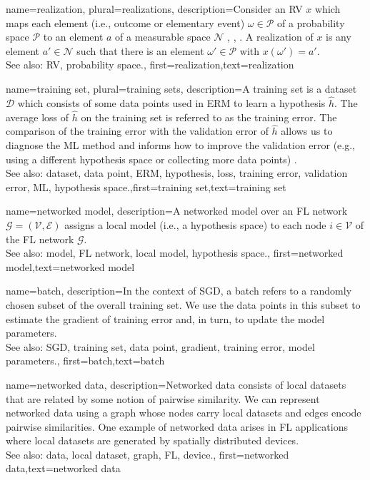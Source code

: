 	
{name={realization}, plural={realizations},
	description={Consider an RV $x$ which maps each element 
	(i.e., outcome or elementary event) $\omega \in \mathcal{P}$ of a probability space $\mathcal{P}$ 
	to an element $a$ of a measurable space $\mathcal{N}$ \cite{RudinBookPrinciplesMatheAnalysis}, \cite{BillingsleyProbMeasure}, \cite{HalmosMeasure}. 
	A realization of $x$ is any element $a' \in \mathcal{N}$ such that there is 
	an element $\omega' \in \mathcal{P}$ with $x(\omega') = a'$.
			\\
		See also: RV, probability space.}, first={realization},text={realization}  }

{name={training set}, plural={training sets},
description={A training set is a dataset $\mathcal{D}$ which consists of some data points used in ERM 
	to learn a hypothesis $\hat{h}$. The average loss of $\hat{h}$ on the 
	training set is referred to as the training error. The comparison of the training error with the 
	validation error of $\hat{h}$ allows us to diagnose the ML method and informs how to improve 
	the validation error (e.g., using a different hypothesis space or collecting more data points) \cite[Sec. 6.6]{MLBasics}.
			\\
		See also: dataset, data point, ERM, hypothesis, loss, training error, validation error, ML, hypothesis space.},first={training set},text={training set}  
}

{name={networked model},
  description={A networked model over an FL network $\mathcal{G} = \left( \mathcal{V},\mathcal{E} \right)$ assigns 
   a local model (i.e., a hypothesis space) to each node $i \in \mathcal{V}$ of the FL network $\mathcal{G}$.
   		\\
		See also: model, FL network, local model, hypothesis space.}, 
   first={networked model},text={networked model}  
}

{
	name={batch},
	description={In the context of SGD, a batch refers to a randomly 
	chosen subset of the overall training set. We use the data points in this subset 
	to estimate the gradient of training error and, in turn, to update the model parameters.
			\\
		See also: SGD, training set, data point, gradient, training error, model parameters.}, 
	first={batch},text={batch}  
}

{
	name={networked data},
	description={Networked data consists of local datasets 
	that are related by some notion of pairwise similarity. We can represent networked 
	data using a graph whose nodes carry local datasets and edges encode 
	pairwise similarities. One example of networked data arises in FL applications 
	where local datasets are generated by spatially distributed devices.
			\\
		See also: data, local dataset, graph, FL, device.}, 
	first={networked data},text={networked data}  
}

